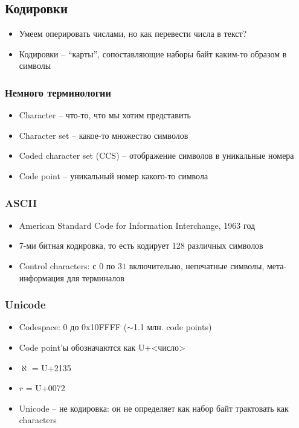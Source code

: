   \subsection{Кодировки}
    \begin{itemize}
      \item Умеем оперировать числами, но как перевести числа в текст?
      \item Кодировки -- ``карты'', сопоставляющие наборы байт каким-то образом в символы
    \end{itemize}
  
  \subsubsection{Немного терминологии}
    \begin{itemize}
      \item Character -- что-то, что мы хотим представить
      \item Character set -- какое-то множество символов
      \item Coded character set (CCS) -- отображение символов в уникальные номера
      \item Code point -- уникальный номер какого-то символа
    \end{itemize}
    
  \subsubsection{ASCII}
    \begin{itemize}
      \item American Standard Code for Information Interchange, 1963 год
      \item 7-ми битная кодировка, то есть кодирует 128 различных символов
      \item Control characters: с $0$ по $31$ включительно, непечатные символы, мета-информация для терминалов
    \end{itemize}
  
  \subsubsection{Unicode}
    \begin{itemize}
      \item Codespace: $0$ до 0x10FFFF ($\sim$1.1 млн. code points)
      \item Code point'ы обозначаются как U+<число>
      \item $\aleph$ = U+2135
      \item $r$ = U+0072
      \item Unicode -- не кодировка: он не определяет как набор байт трактовать как characters
    \end{itemize}
  
